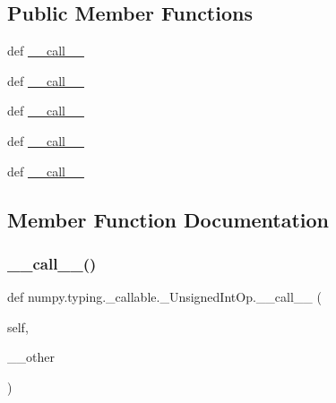 \subsection*{Public Member Functions}
\begin{DoxyCompactItemize}
\item 
def \hyperlink{classnumpy_1_1typing_1_1__callable_1_1__UnsignedIntOp_ade4aeb92f51afef318678b202a887f71}{\+\_\+\+\_\+call\+\_\+\+\_\+}
\item 
def \hyperlink{classnumpy_1_1typing_1_1__callable_1_1__UnsignedIntOp_ade4aeb92f51afef318678b202a887f71}{\+\_\+\+\_\+call\+\_\+\+\_\+}
\item 
def \hyperlink{classnumpy_1_1typing_1_1__callable_1_1__UnsignedIntOp_ade4aeb92f51afef318678b202a887f71}{\+\_\+\+\_\+call\+\_\+\+\_\+}
\item 
def \hyperlink{classnumpy_1_1typing_1_1__callable_1_1__UnsignedIntOp_ade4aeb92f51afef318678b202a887f71}{\+\_\+\+\_\+call\+\_\+\+\_\+}
\item 
def \hyperlink{classnumpy_1_1typing_1_1__callable_1_1__UnsignedIntOp_ade4aeb92f51afef318678b202a887f71}{\+\_\+\+\_\+call\+\_\+\+\_\+}
\end{DoxyCompactItemize}


\subsection{Member Function Documentation}
\mbox{\label{classnumpy_1_1typing_1_1__callable_1_1__UnsignedIntOp_ade4aeb92f51afef318678b202a887f71}} 
\subsubsection{\texorpdfstring{\+\_\+\+\_\+call\+\_\+\+\_\+()}{\_\_call\_\_()}\hspace{0.1cm}{\footnotesize\ttfamily [1/5]}}
{\footnotesize\ttfamily def numpy.\+typing.\+\_\+callable.\+\_\+\+Unsigned\+Int\+Op.\+\_\+\+\_\+call\+\_\+\+\_\+ (\begin{DoxyParamCaption}\item[{}]{self,  }\item[{}]{\+\_\+\+\_\+other }\end{DoxyParamCaption})}

